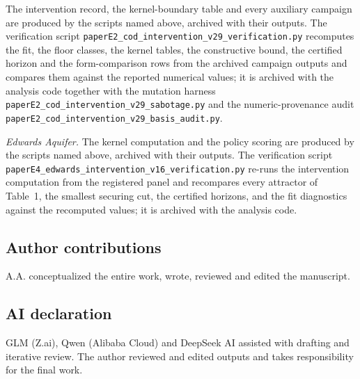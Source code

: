 \documentclass[11pt]{article}
\begin{document}
The intervention record, the kernel-boundary table and every auxiliary
campaign are produced by the scripts named above, archived with their
outputs. The verification script
\texttt{paperE2\_cod\_intervention\_v29\_verification.py} recomputes the
fit, the floor classes, the kernel tables, the constructive bound, the
certified horizon and the form-comparison rows from the archived campaign
outputs and compares them against the reported numerical values; it
is archived with the analysis code together with the mutation harness
\texttt{paperE2\_cod\_intervention\_v29\_sabotage.py} and the
numeric-provenance audit
\texttt{paperE2\_cod\_intervention\_v29\_basis\_audit.py}.

\emph{Edwards Aquifer.} The kernel computation and the policy scoring are produced by the scripts
named above, archived with their outputs. The verification script
\texttt{paperE4\_edwards\_intervention\_v16\_verification.py} re-runs
the intervention computation from the registered panel and recompares
every attractor of Table~1, the smallest securing cut, the certified
horizons, and the fit diagnostics against the recomputed values; it is
archived with the analysis code.

\subsection*{Author contributions}
A.A. conceptualized the entire work, wrote, reviewed and edited the manuscript.

\subsection*{AI declaration}
GLM (Z.ai), Qwen (Alibaba Cloud) and DeepSeek AI assisted with drafting
and iterative review. The author reviewed and edited outputs and takes
responsibility for the final work.
\end{document}
